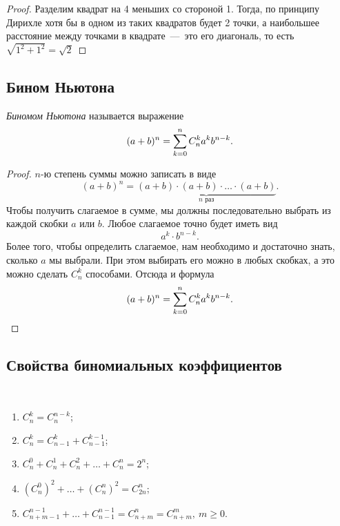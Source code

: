 \begin{proof}
	Разделим квадрат на 4 меньших со стороной 1. Тогда, по принципу Дирихле хотя бы в одном из таких квадратов будет 2 точки, а наибольшее расстояние между точками в квадрате~---~это его диагональ, то есть $\sqrt{1^2 + 1^2} = \sqrt{2}$
\end{proof}

\subsection{Бином Ньютона}

\begin{definition}
	\textit{Биномом Ньютона} называется выражение
	\[
		(a + b)^n = \sum\limits_{k = 0}^n C_n^k a^k b^{n - k}.
	\]
\end{definition}

\begin{proof}
	$n$-ю степень суммы можно записать в виде
	\[
		(a + b)^n = \underbrace{(a + b) \cdot (a + b) \cdot \ldots \cdot (a + b)}_{n \text{ раз}}.
	\]
	Чтобы получить слагаемое в сумме, мы должны последовательно выбрать из каждой скобки $a$ или $b$. Любое слагаемое точно будет иметь вид
	\[
		a^k \cdot b^{n - k}.
	\]
	Более того, чтобы определить слагаемое, нам необходимо и достаточно знать, сколько $a$ мы выбрали. При этом выбирать его можно в любых скобках, а это можно сделать $C_n^k$ способами. Отсюда и формула
	\[
		(a + b)^n = \sum\limits_{k = 0}^n C_n^k a^k b^{n - k}.
	\]
\end{proof}

\subsection{Свойства биномиальных коэффициентов}

\begin{theorem}~
	\begin{enumerate}
		\item $C_n^k = C_n^{n - k}$;
		\item $C_n^k = C_{n - 1}^k + C_{n - 1}^{k - 1}$;
		\item $C_n^0 + C_n^1 + C_n^2 + \ldots + C_n^n = 2^n$;
		\item $\left(C_n^0\right)^2 + \ldots + \left(C_n^n\right)^2 = C_{2n}^n$;
		\item $C_{n + m - 1}^{n - 1} + \ldots + C_{n - 1}^{n - 1} = C_{n + m}^n = C_{n + m}^m,\ m \ge 0$.
	\end{enumerate}
\end{theorem}

